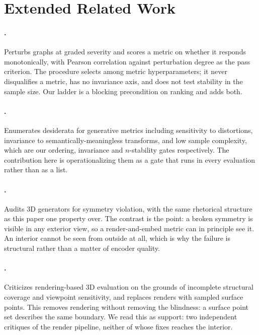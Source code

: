 \section{Extended Related Work}
\label{app:related}

\paragraph{\citet{obray2022graphmetrics}.} Perturbs graphs at graded severity
and scores a metric on whether it responds monotonically, with Pearson
correlation against perturbation degree as the pass criterion. The procedure
selects among metric hyperparameters; it never disqualifies a metric, has no
invariance axis, and does not test stability in the sample size. Our ladder is a
blocking precondition on ranking and adds both.

\paragraph{\citet{borji2019prosandcons}.} Enumerates desiderata for generative
metrics including sensitivity to distortions, invariance to
semantically-meaningless transforms, and low sample complexity, which are our ordering,
invariance and $n$-stability gates respectively. The contribution here is
operationalizing them as a gate that runs in every evaluation rather than as a
list.

\paragraph{\citet{caytuiro2025symmetry}.} Audits {3D} generators for symmetry
violation, with the same rhetorical structure as this paper one property over.
The contrast is the point: a broken symmetry is visible in any exterior view, so
a render-and-embed metric can in principle see it. An interior cannot be seen
from outside at all, which is why the failure is structural rather than a matter
of encoder quality.

\paragraph{\citet{luan2026rendermetric}.} Criticizes rendering-based {3D}
evaluation on the grounds of incomplete structural coverage and viewpoint
sensitivity, and replaces renders with sampled surface points. This removes
rendering without removing the blindness: a surface point set describes the same
boundary. We read this as support: two independent critiques of the render
pipeline, neither of whose fixes reaches the interior.

